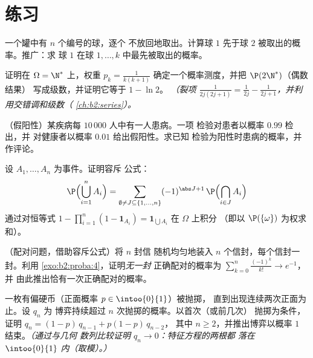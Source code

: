 \section{练习}

\begin{exercise}[$\star$]\label{exo:b2:proba:1}
一个罐中有 $n$ 个编号的球，逐个
不放回地取出。计算球 $1$
先于球 $2$ 被取出的概率。推广：求
球 $1$ 在球 $1, \dots, k$ 中最先被取出的概率。
\end{exercise}

\begin{exercise}[$\star$]\label{exo:b2:proba:2}
证明在 $\Omega = \N^*$ 上，权重 $p_k = \frac{1}{k(k+1)}$
确定一个概率测度，并把 $\P(2\N^*)$（偶数结果）
写成级数，并证明它等于 $1 - \ln 2$。
\emph{（裂项 $\frac{1}{2j(2j+1)} = \frac{1}{2j} -
\frac{1}{2j+1}$，并利用交错调和级数（
\cref{ch:b2:series}）。}
\end{exercise}

\begin{exercise}[$\star$]\label{exo:b2:proba:3}
（假阳性）某疾病每 $10\,000$ 人中有一人患病。一项
检验对患者以概率 $0.99$ 检出，并
对健康者以概率 $0.01$ 给出假阳性。求已知
检验为阳性时患病的概率，并作评论。
\end{exercise}

\begin{exercise}[$\star\star$]\label{exo:b2:proba:4}
设 $A_1, \dots, A_n$ 为事件。证明容斥
公式：
\[
\P\Bigl(\bigcup_{i=1}^n A_i\Bigr)
= \sum_{\emptyset \neq J \subseteq \{1,\dots,n\}}
(-1)^{\abs J + 1}\,\P\Bigl(\bigcap_{i \in J}A_i\Bigr)
\]
通过对恒等式 $1 - \prod_{i=1}^n(1 -
\mathbf{1}_{A_i}) = \mathbf{1}_{\bigcup A_i}$ 在 $\Omega$ 上积分
（即以 $\P(\{\omega\})$ 为权求和）。
\end{exercise}

\begin{exercise}[$\star\star$]\label{exo:b2:proba:5}
（配对问题，借助容斥公式）将 $n$ 封信
随机均匀地装入 $n$ 个信封，每个信封一封。利用
\cref{exo:b2:proba:4}，证明\emph{无一封}
正确配对的概率为 $\sum_{k=0}^n \frac{(-1)^k}{k!} \to e^{-1}$，并
由此推出恰有一次正确配对的概率。
\end{exercise}

\begin{exercise}[$\star\star$]\label{exo:b2:proba:6}
一枚有偏硬币（正面概率 $p \in \intoo{0}{1}$）被抛掷，
直到出现连续两次正面为止。设 $q_n$ 为
博弈持续超过 $n$ 次抛掷的概率。以首次（或前几次）
抛掷为条件，证明 $q_n = (1-p)\,q_{n-1} + p(1-p)\,q_{n-2}$，
其中 $n \geq 2$，并推出博弈以概率
$1$ 结束。\emph{（通过与几何
数列比较证明 $q_n \to 0$：特征方程的两根都
落在 $\intoo{0}{1}$ 内（取模）。）}
\end{exercise}

